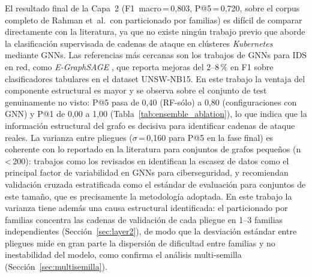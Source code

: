 El resultado final de la Capa~2 (F1~macro\,=\,0,803, P@5\,=\,0,720, sobre el
corpus completo de Rahman et~al.\ con particionado por familias) es difícil de
comparar directamente con la literatura, ya que no existe ningún trabajo previo
que aborde la clasificación supervisada de cadenas de ataque en clústeres
\textit{Kubernetes} mediante \acs{GNN}s. Las referencias más cercanas son los
trabajos de \acs{GNN}s para \ac{IDS} en red, como \textit{E-GraphSAGE}
\citep{Lo2022}, que reporta mejoras del 2--8\,\% en F1 sobre clasificadores
tabulares en el dataset UNSW-NB15. En este trabajo la ventaja del componente
estructural es mayor y se observa sobre el conjunto de test genuinamente no
visto: P@5 pasa de 0,40 (\ac{RF}-sólo) a 0,80 (configuraciones con \ac{GNN}) y
P@1 de 0,00 a 1,00 (Tabla~\ref{tab:ensemble_ablation}), lo que indica que la
información estructural del grafo es decisiva para identificar cadenas de
ataque reales.
La varianza entre pliegues (\(\sigma\)\,=\,0,160 para P@5 en la fase final) es
coherente con lo reportado en la literatura para conjuntos de grafos pequeños
(n\,<\,200): trabajos como los revisados en \citeauthor{GNNSurvey2024}
\citeyear{GNNSurvey2024} identifican la escasez de datos como el principal
factor de variabilidad en \acs{GNN}s para ciberseguridad, y recomiendan
validación cruzada estratificada como el estándar de evaluación para conjuntos
de este tamaño, que es precisamente la metodología adoptada. En este trabajo la
varianza tiene además una causa estructural identificada: el particionado por
familias concentra las cadenas de validación de cada pliegue en 1--3 familias
independientes (Sección~\ref{sec:layer2}), de modo que la desviación estándar
entre pliegues mide en gran parte la dispersión de dificultad entre familias y
no inestabilidad del modelo, como confirma el análisis multi-semilla
(Sección~\ref{sec:multisemilla}).
